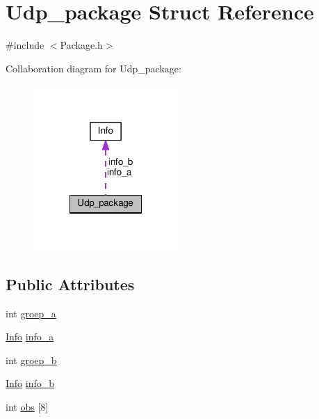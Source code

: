 \hypertarget{structUdp__package}{\section{Udp\-\_\-package Struct Reference}
\label{structUdp__package}
}


{\ttfamily \#include $<$Package.\-h$>$}



Collaboration diagram for Udp\-\_\-package\-:
\nopagebreak
\begin{figure}[H]
\begin{center}
\leavevmode
\includegraphics[width=156pt]{structUdp__package__coll__graph}
\end{center}
\end{figure}
\subsection*{Public Attributes}
\begin{DoxyCompactItemize}
\item 
int \hyperlink{structUdp__package_a970184a6e334fe29f4692718f271fdb0}{groep\-\_\-a}
\item 
\hyperlink{structInfo}{Info} \hyperlink{structUdp__package_a6cb537db96ffd959c77f135e44cfba3e}{info\-\_\-a}
\item 
int \hyperlink{structUdp__package_a8db8b9a082bf209e329b97a8a94cf690}{groep\-\_\-b}
\item 
\hyperlink{structInfo}{Info} \hyperlink{structUdp__package_ae1e5f1d35dfdae47b8750cbf4181bcac}{info\-\_\-b}
\item 
int \hyperlink{structUdp__package_a9b33ca73a59acb03b87d840a2086de68}{obs} \mbox{[}8\mbox{]}
\end{DoxyCompactItemize}


